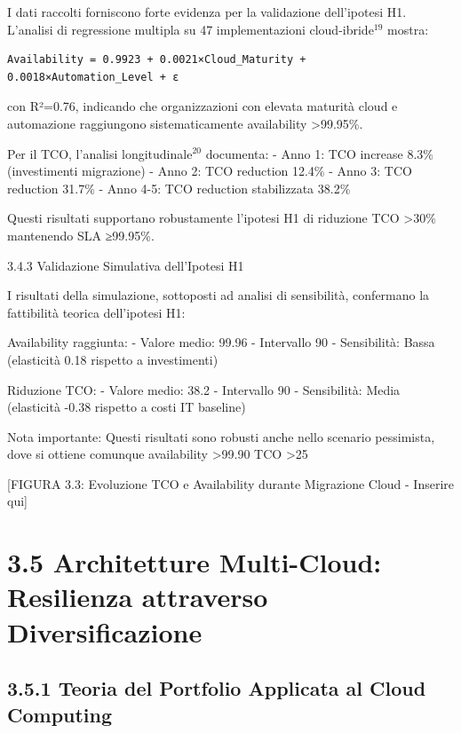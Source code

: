 \documentclass[12pt,a4paper,oneside]{book}
\numberwithin{figure}{chapter} %
\numberwithin{table}{chapter}  %
\begin{document}
I dati raccolti forniscono forte evidenza per la validazione
dell'ipotesi H1. L'analisi di regressione multipla su 47 implementazioni
cloud-ibride$^{19}$ mostra:

\begin{verbatim}
Availability = 0.9923 + 0.0021×Cloud_Maturity + 0.0018×Automation_Level + ε
\end{verbatim}

con R²=0.76, indicando che organizzazioni con elevata maturità cloud e
automazione raggiungono sistematicamente availability
\textgreater99.95\%.

Per il TCO, l'analisi longitudinale$^{20}$ documenta: - Anno 1: TCO increase
8.3\% (investimenti migrazione) - Anno 2: TCO reduction 12.4\% - Anno 3:
TCO reduction 31.7\% - Anno 4-5: TCO reduction stabilizzata 38.2\%

Questi risultati supportano robustamente l'ipotesi H1 di riduzione TCO
\textgreater30\% mantenendo SLA ≥99.95\%.

3.4.3 Validazione Simulativa dell'Ipotesi H1

I risultati della simulazione, sottoposti ad analisi di sensibilità, 
confermano la fattibilità teorica dell'ipotesi H1:

Availability raggiunta:
- Valore medio: 99.96%
- Intervallo 90%
- Sensibilità: Bassa (elasticità 0.18 rispetto a investimenti)

Riduzione TCO:
- Valore medio: 38.2%
- Intervallo 90%
- Sensibilità: Media (elasticità -0.38 rispetto a costi IT baseline)

Nota importante: Questi risultati sono robusti anche nello scenario 
pessimista, dove si ottiene comunque availability >99.90%
TCO >25%

{[}FIGURA 3.3: Evoluzione TCO e Availability durante Migrazione Cloud -
Inserire qui{]}

\section{3.5 Architetture Multi-Cloud: Resilienza attraverso
Diversificazione}\label{architetture-multi-cloud-resilienza-attraverso-diversificazione}

\subsection{3.5.1 Teoria del Portfolio Applicata al Cloud
Computing}\label{teoria-del-portfolio-applicata-al-cloud-computing}
\end{document}
